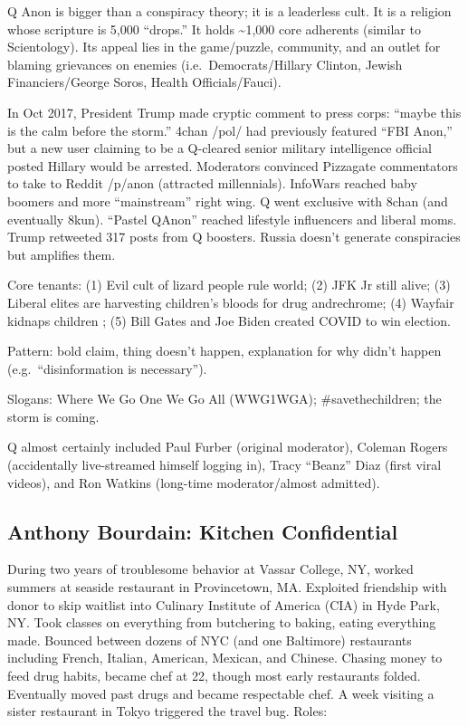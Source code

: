\documentclass[
]{article}
\begin{document}
Q Anon is bigger than a conspiracy theory; it is a leaderless cult. It
is a religion whose scripture is 5,000 ``drops.'' It holds
\textasciitilde1,000 core adherents (similar to Scientology). Its appeal
lies in the game/puzzle, community, and an outlet for blaming grievances
on enemies (i.e.~Democrats/Hillary Clinton, Jewish Financiers/George
Soros, Health Officials/Fauci).

In Oct 2017, President Trump made cryptic comment to press corps:
``maybe this is the calm before the storm.'' 4chan /pol/ had previously
featured ``FBI Anon,'' but a new user claiming to be a Q-cleared senior
military intelligence official posted Hillary would be arrested.
Moderators convinced Pizzagate commentators to take to Reddit /p/anon
(attracted millennials). InfoWars reached baby boomers and more
``mainstream'' right wing. Q went exclusive with 8chan (and eventually
8kun). ``Pastel QAnon'' reached lifestyle influencers and liberal moms.
Trump retweeted 317 posts from Q boosters. Russia doesn't generate
conspiracies but amplifies them.

Core tenants: (1) Evil cult of lizard people rule world; (2) JFK Jr
still alive; (3) Liberal elites are harvesting children's bloods for
drug andrechrome; (4) Wayfair kidnaps children ; (5) Bill Gates and Joe
Biden created COVID to win election.

Pattern: bold claim, thing doesn't happen, explanation for why didn't
happen (e.g.~``disinformation is necessary'').

Slogans: Where We Go One We Go All (WWG1WGA); \#savethechildren; the
storm is coming.

Q almost certainly included Paul Furber (original moderator), Coleman
Rogers (accidentally live-streamed himself logging in), Tracy ``Beanz''
Diaz (first viral videos), and Ron Watkins (long-time moderator/almost
admitted).

\hypertarget{anthony-bourdain-kitchen-confidential}{%
\subsection{Anthony Bourdain: Kitchen
Confidential}\label{anthony-bourdain-kitchen-confidential}}

During two years of troublesome behavior at Vassar College, NY, worked
summers at seaside restaurant in Provincetown, MA. Exploited friendship
with donor to skip waitlist into Culinary Institute of America (CIA) in
Hyde Park, NY. Took classes on everything from butchering to baking,
eating everything made. Bounced between dozens of NYC (and one
Baltimore) restaurants including French, Italian, American, Mexican, and
Chinese. Chasing money to feed drug habits, became chef at 22, though
most early restaurants folded. Eventually moved past drugs and became
respectable chef. A week visiting a sister restaurant in Tokyo triggered
the travel bug. Roles:
\end{document}
